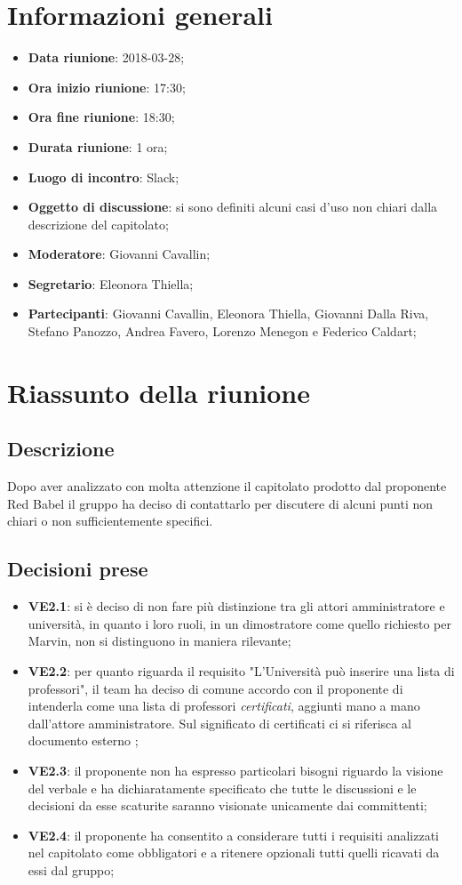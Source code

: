 \section{Informazioni generali}
	\begin{itemize}
		\item \textbf{Data riunione}: 2018-03-28;
		\item \textbf{Ora inizio riunione}: 17:30;
		\item \textbf{Ora fine riunione}: 18:30;
		\item \textbf{Durata riunione}: 1 ora;
		\item \textbf{Luogo di incontro}: Slack;
		\item \textbf{Oggetto di discussione}: si sono definiti alcuni casi d'uso non chiari dalla descrizione del capitolato;
		\item \textbf{Moderatore}: Giovanni Cavallin;
		\item \textbf{Segretario}: Eleonora Thiella;
		\item \textbf{Partecipanti}: Giovanni Cavallin, Eleonora Thiella, Giovanni Dalla Riva, Stefano Panozzo, Andrea Favero, Lorenzo Menegon e Federico Caldart;
	\end{itemize}

\section{Riassunto della riunione}
	\subsection{Descrizione}
	Dopo aver analizzato con molta attenzione il capitolato prodotto dal proponente Red Babel il gruppo ha deciso di contattarlo per discutere di alcuni punti non chiari o non sufficientemente specifici.
	\subsection{Decisioni prese}
		\begin{itemize}
			\item \textbf{VE2.1}: si è deciso di non fare più distinzione tra gli attori amministratore e università, in quanto i loro ruoli, in un dimostratore come quello richiesto per Marvin, non si distinguono in maniera rilevante;
			\item \textbf{VE2.2}: per quanto riguarda il requisito "L'Università può inserire una lista di professori", il team ha deciso di comune accordo con il proponente di intenderla come una lista di professori \emph{certificati}, aggiunti mano a mano dall'attore amministratore. Sul significato di certificati ci si riferisca al documento esterno \AdR{}; 
			\item \textbf{VE2.3}: il proponente non ha espresso particolari bisogni riguardo la visione del verbale e ha dichiaratamente specificato che tutte le discussioni e le decisioni da esse scaturite saranno visionate unicamente dai committenti;
			\item \textbf{VE2.4}: il proponente ha consentito a considerare tutti i requisiti analizzati nel capitolato come obbligatori e a ritenere opzionali tutti quelli ricavati da essi dal gruppo;
		\end{itemize}